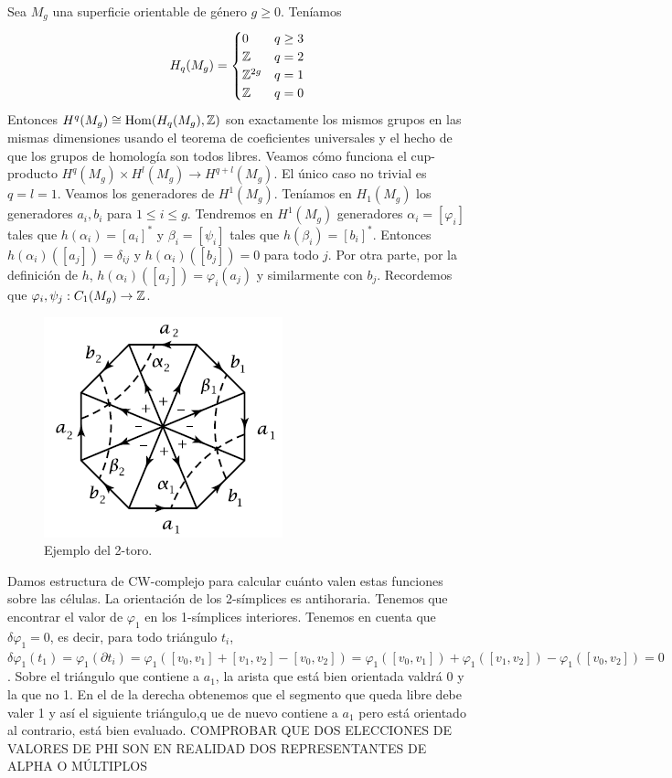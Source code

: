 \documentclass[TA.tex]{subfiles}
\begin{document}
\begin{ej}
Sea $M_g$ una superficie orientable de género $g\geq 0$. Teníamos $$H_q(M_g)=\begin{cases}
0 & q\geq 3\\
\mathbb{Z} & q=2\\
\mathbb{Z}^{2g} & q=1\\
\mathbb{Z} & q=0
\end{cases}$$
Entonces $H^q(M_g)\cong \operatorname{Hom}(H_q(M_g),\mathbb{Z})$ son exactamente los mismos grupos en las mismas dimensiones usando el teorema de coeficientes universales y el hecho de que los grupos de homología son todos libres. Veamos cómo funciona el cup-producto $H^q(M_g)\times H^l(M_g)\to H^{q+l}(M_g)$. El único caso no trivial es $q=l=1$. Veamos los generadores de $H^1(M_g)$. Teníamos en $H_1(M_g)$ los generadores $a_i,b_i$ para $1\leq i\leq g$. Tendremos en $H^1(M_g)$ generadores $\alpha_i=[\varphi_i]$ tales que $h(\alpha_i)=[a_i]^*$ y $\beta_i=[\psi_i]$ tales que $h(\beta_i)=[b_i]^*$. Entonces $h(\alpha_i)([a_j])=\delta_{ij}$ y $h(\alpha_i)([b_j])=0$ para todo $j$. Por otra parte, por la definición de $h$, $h(\alpha_i)([a_j])=\varphi_i(a_j)$ y similarmente con $b_j$. Recordemos que $\varphi_i,\psi_j:C_1(M_g)\to \mathbb{Z}$. 

\begin{figure}[h!]
\includegraphics[scale=0.7]{cup}
\caption{Ejemplo del 2-toro.}
\end{figure}

Damos estructura de CW-complejo para calcular cuánto valen estas funciones sobre las células. La orientación de los 2-símplices es antihoraria. Tenemos que encontrar el valor de $\varphi_1$ en los 1-símplices interiores. Tenemos en cuenta que $\delta\varphi_1=0$, es decir, para todo triángulo $t_i$, $\delta\varphi_1(t_1)=\varphi_1(\partial t_i)=\varphi_1([v_0,v_1]+[v_1,v_2]-[v_0,v_2])=\varphi_1([v_0,v_1])+\varphi_1([v_1,v_2])-\varphi_1([v_0,v_2])=0$. Sobre el triángulo que contiene a $a_1$, la arista que está bien orientada valdrá 0 y la que no 1. En el de la derecha obtenemos que el segmento que queda libre debe valer 1 y así el siguiente triángulo,q ue de nuevo contiene a $a_1$ pero está orientado al contrario, está bien evaluado. COMPROBAR QUE DOS ELECCIONES DE VALORES DE PHI SON EN REALIDAD DOS REPRESENTANTES DE ALPHA O MÚLTIPLOS


\end{ej}
\end{document}
